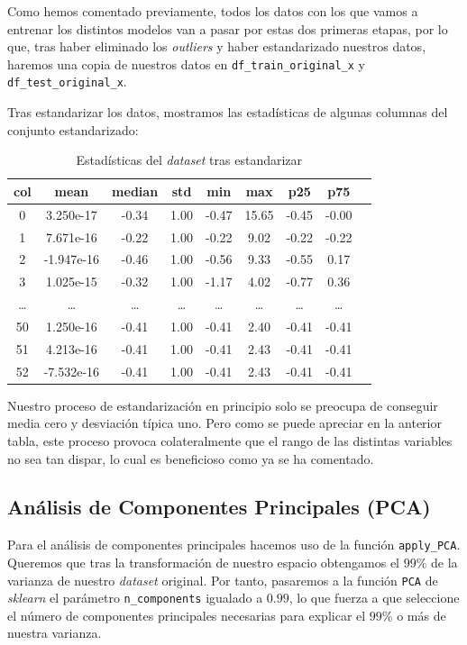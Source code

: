 \documentclass[11pt]{article}
\begin{document}
Como hemos comentado previamente, todos los datos con los que vamos a entrenar los distintos modelos van a pasar por estas dos primeras etapas, por lo que, tras haber eliminado los \emph{outliers} y haber estandarizado nuestros datos, haremos una copia de nuestros datos en \lstinline{df_train_original_x} y \lstinline{df_test_original_x}.

Tras estandarizar los datos, mostramos las estadísticas de algunas columnas del conjunto estandarizado:

\begin{table}[H]
  \centering
  \begin{tabular}{|c|c|c|c|c|c|c|c|c|}
  \hline
\textbf{col}  &         \textbf{mean}&         \textbf{median}&           \textbf{std}&     \textbf{min}&           \textbf{max}&           \textbf{p25}&           \textbf{p75} \\
\hline
0  &  3.250e-17& -0.34&  1.00&  -0.47&   15.65& -0.45& -0.00\\
1  &  7.671e-16& -0.22&  1.00&  -0.22&    9.02& -0.22& -0.22\\
2  & -1.947e-16& -0.46&  1.00&  -0.56&    9.33& -0.55&  0.17\\
3  &  1.025e-15& -0.32&  1.00&  -1.17&    4.02& -0.77&  0.36\\
\ldots  &  \ldots & \ldots &  \ldots &  \ldots &    \ldots & \ldots &  \ldots \\
50 &  1.250e-16& -0.41&  1.00&  -0.41&    2.40& -0.41& -0.41\\
51 &  4.213e-16& -0.41&  1.00&  -0.41&    2.43& -0.41& -0.41\\
52 & -7.532e-16& -0.41&  1.00&  -0.41&    2.43& -0.41& -0.41\\
\hline
  \end{tabular}
  \caption{Estadísticas del \emph{dataset} tras estandarizar}
  \label{tabla_std}
\end{table}

Nuestro proceso de estandarización en principio solo se preocupa de conseguir media cero y desviación típica uno. Pero como se puede apreciar en la anterior tabla, este proceso provoca colateralmente que el rango de las distintas variables no sea tan dispar, lo cual es beneficioso como ya se ha comentado.

\subsection{Análisis de Componentes Principales (PCA)}

Para el análisis de componentes principales hacemos uso de la función \lstinline{apply_PCA}. Queremos que tras la transformación de nuestro espacio obtengamos el $99\%$ de la varianza de nuestro \emph{dataset} original. Por tanto, pasaremos a la función \lstinline{PCA} de \emph{sklearn} el parámetro \lstinline{n_components} igualado a $0.99$, lo que fuerza a que seleccione el número de componentes principales necesarias para explicar el $99\%$ o más de nuestra varianza.
\end{document}
